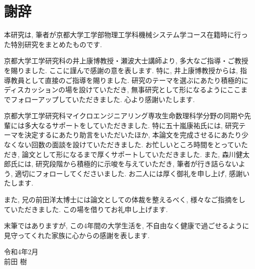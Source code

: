 
\chapter*{謝辞}

本研究は, 筆者が京都大学工学部物理工学科機械システム学コース在籍時に行った特別研究をまとめたものです.

京都大学工学研究科の井上康博教授・瀬波大士講師より, 多大なご指導・ご教授を賜りました. ここに謹んで感謝の意を表します. 特に, 井上康博教授からは, 指導教員として直接のご指導を賜りました. 研究のテーマを選ぶにあたり積極的にディスカッションの場を設けていただき, 無事研究として形になるようにここまでフォローアップしていただきました. 心より感謝いたします.

京都大学工学研究科マイクロエンジニアリング専攻生命数理科学分野の同期や先輩には多大なるサポートをしていただきました. 特に五十嵐康祐氏には, 研究テーマを決定するにあたり助言をいただいたほか, 本論文を完成させるにあたり少なくない回数の面談を設けていただきました. お忙しいところ時間をとっていただき, 論文として形になるまで厚くサポートしていただきました. また, 森川健太郎氏には, 研究段階から積極的に示唆を与えていただき, 筆者が行き詰らないよう, 適切にフォローしてくださいました. お二人には厚く御礼を申し上げ, 感謝いたします.

また, 兄の前田洋太博士には論文としての体裁を整えるべく, 様々なご指摘をしていただきました. この場を借りてお礼申し上げます.

末筆ではありますが, この4年間の大学生活を, 不自由なく健康で過ごせるように見守ってくれた家族に心からの感謝を表します.

\begin{flushright}
  令和4年2月\\
  前田 樹
\end{flushright}
